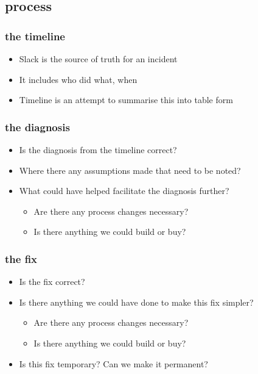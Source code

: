 \documentclass[]{beamer}
\begin{document}
\subsection{process}
\begin{frame}
  \frametitle{the timeline}

  \begin{itemize}[<+->]
  \item Slack is the source of truth for an incident
  \item It includes who did what, when
  \item Timeline is an attempt to summarise this into table form
  \end{itemize}
\end{frame}

\begin{frame}
  \frametitle{the diagnosis}

  \begin{itemize}[<+->]
  \item Is the diagnosis from the timeline correct?
  \item Where there any assumptions made that need to be noted?
  \item What could have helped facilitate the diagnosis further?
    \begin{itemize}
    \item Are there any process changes necessary?
    \item Is there anything we could build or buy?
    \end{itemize}
  \end{itemize}
\end{frame}

\begin{frame}
  \frametitle{the fix}

  \begin{itemize}[<+->]
  \item Is the fix correct?
  \item Is there anything we could have done to make this fix simpler?
    \begin{itemize}
    \item Are there any process changes necessary?
    \item Is there anything we could build or buy?
    \end{itemize}
  \item Is this fix temporary? Can we make it permanent?
  \end{itemize}
\end{frame}
\end{document}
